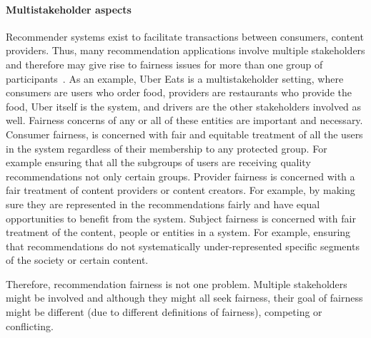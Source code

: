 
    
\paragraph{Multistakeholder aspects}
Recommender systems exist to facilitate transactions between consumers, content providers. Thus, many recommendation applications involve multiple stakeholders and therefore may give rise to fairness issues for more than one group of participants~\cite{burke_multisided_2017}.
As an example, Uber Eats is a multistakeholder setting, where consumers are users who order food, providers are restaurants who provide the food, Uber itself is the system, and drivers are the other stakeholders involved as well. Fairness concerns of any or all of these entities are important and necessary.
Consumer fairness, is concerned with fair and equitable treatment of all the users in the system regardless of their membership to any protected group. For example ensuring that all the subgroups of users are receiving quality recommendations not only certain groups. Provider fairness is concerned with a fair treatment of content providers or content creators. For example, by making sure they are represented in the recommendations fairly and have equal opportunities to benefit from the system. Subject fairness is concerned with fair treatment of the content, people or entities in a system. For example, ensuring that recommendations do not systematically under-represented specific segments of the society or certain content.

Therefore, recommendation fairness is not one problem. Multiple stakeholders might be involved and although they might all seek fairness, their goal of fairness might be different (due to different definitions of fairness), competing or conflicting.

